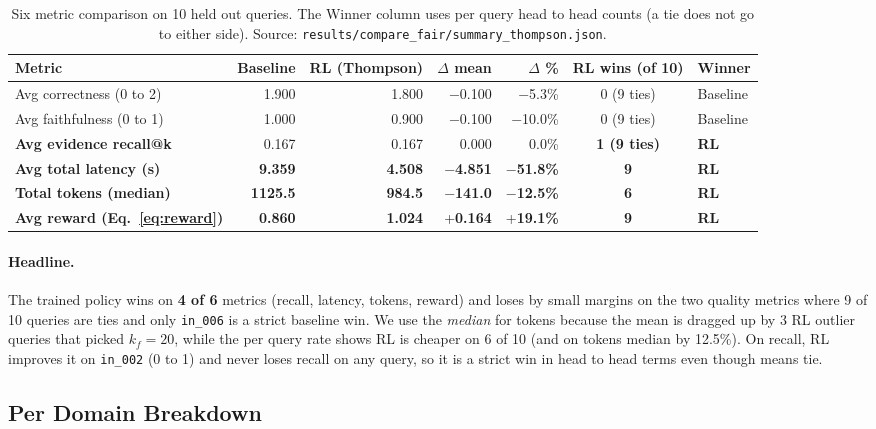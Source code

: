 \documentclass{article}
\begin{document}
\begin{table}[h]
\centering
\caption{Six metric comparison on 10 held out queries. The Winner column uses per query head to head counts (a tie does not go to either side). Source: \texttt{results/compare\_fair/summary\_thompson.json}.}
\label{tab:headline}
\small
\begin{tabular}{lrrrrcl}
\toprule
Metric & Baseline & RL (Thompson) & $\Delta$ mean & $\Delta$ \% & RL wins (of 10) & Winner \\
\midrule
Avg correctness (0 to 2)      & 1.900   & 1.800   & $-$0.100  & $-$5.3\%   & 0 (9 ties)   & Baseline \\
Avg faithfulness (0 to 1)     & 1.000   & 0.900   & $-$0.100  & $-$10.0\%  & 0 (9 ties)   & Baseline \\
\textbf{Avg evidence recall@k}    & 0.167   & 0.167   & 0.000     & 0.0\%      & \textbf{1 (9 ties)}   & \textbf{RL} \\
\textbf{Avg total latency (s)}    & \textbf{9.359}   & \textbf{4.508}   & $-$\textbf{4.851}  & $-$\textbf{51.8\%}  & \textbf{9}   & \textbf{RL} \\
\textbf{Total tokens (median)}    & \textbf{1125.5} & \textbf{984.5}   & $-$\textbf{141.0}  & $-$\textbf{12.5\%}  & \textbf{6}   & \textbf{RL} \\
\textbf{Avg reward (Eq.~\ref{eq:reward})} & \textbf{0.860}   & \textbf{1.024}   & +\textbf{0.164}  & +\textbf{19.1\%}  & \textbf{9}   & \textbf{RL} \\
\bottomrule
\end{tabular}
\end{table}

\paragraph{Headline.} The trained policy wins on \textbf{4 of 6} metrics (recall, latency, tokens, reward) and loses by small margins on the two quality metrics where 9 of 10 queries are ties and only \texttt{in\_006} is a strict baseline win. We use the \textit{median} for tokens because the mean is dragged up by 3 RL outlier queries that picked $k_f=20$, while the per query rate shows RL is cheaper on 6 of 10 (and on tokens median by 12.5\%). On recall, RL improves it on \texttt{in\_002} (0 to 1) and never loses recall on any query, so it is a strict win in head to head terms even though means tie.

\subsection{Per Domain Breakdown}
\end{document}
